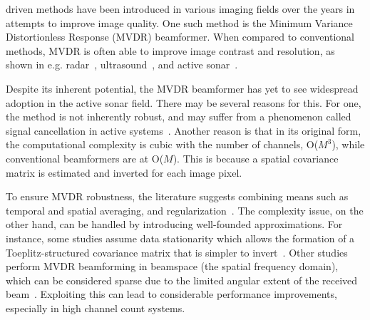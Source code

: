 \documentclass[12pt,journal,draftclsnofoot,onecolumn]{IEEEtran}
\newcounter{todoidx}
\newlength\marginparwidthsmall
\newcommand\todo[1]{%
      \addtocounter{todoidx}{1}%
      {\color{Red}\bf(\thetodoidx{})}%
      \marginpar{%
         {\vspace*{-10pt}\color{Red}\fbox{\bf\thetodoidx{}}}\\%
         \fcolorbox{red}{todobackground}{\parbox{\marginparwidthsmall}{\scriptsize #1}}}}
\newcommand\todo[1]{}
\newcommand\1{\vec 1}
\begin{document}
 driven methods have been introduced in various imaging fields over the years in attempts to improve image quality. One such method is the Minimum Variance Distortionless Response (MVDR) beamformer. When compared to conventional methods, MVDR is often able to improve image contrast and resolution, as shown in e.g. radar~\cite{Benitz1997}, ultrasound~\cite{Synnevag2007}, and active sonar~\cite{Blomberg2012a,Blomberg2011,Dursun2009,Lo2004}.

Despite its inherent potential, the MVDR beamformer has yet to see widespread adoption in the active sonar field. There may be several reasons for this. For one, the method is not inherently robust, and may suffer from a phenomenon called signal cancellation in active systems~\cite{Widrow1982}. Another reason is that in its original form, the computational complexity is cubic with the number of channels, O($M^3$), while conventional beamformers are at O($M$). This is because a spatial covariance matrix is estimated and inverted for each image pixel.

To ensure MVDR robustness, the literature suggests combining means such as temporal and spatial averaging, and regularization~\cite{VanTrees2002,Kailath1985}. The complexity issue, on the other hand, can be handled by introducing well-founded approximations. For instance, some studies assume data stationarity which allows the formation of a Toeplitz-structured covariance matrix that is simpler to invert~\cite{Asl2012a,Jakobsson2000}. Other studies perform MVDR beamforming in beamspace (the spatial frequency domain), which can be considered sparse due to the limited angular extent of the received beam~\cite{VanTrees2002,Nilsen2009}. Exploiting this can lead to considerable performance improvements, especially in high channel count systems.



\end{document}
